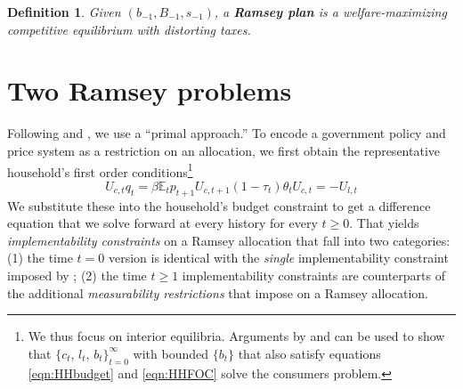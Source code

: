 \documentclass[12pt]{article}
\newcommand{\EE}{\mathbb E}
\newtheorem{definition}[theorem]{Definition}
\begin{document}
\begin{definition}
Given $\left( b_{-1},B_{-1},s_{-1}\right) $, a \textbf{Ramsey plan} is a welfare-maximizing competitive
equilibrium with distorting taxes.
\end{definition}


\section{Two Ramsey problems}

Following \citet{LucasJr.1983}
and
\citet{Aiyagari2002}, we use a
``primal approach.''   To encode a  government policy and price system as a restriction on an allocation,
we  first obtain   the representative household's first order conditions\footnote{We thus focus on interior equilibria. Arguments by \cite{Magill1994} and \cite{Constantinides1996} can be used to show that  $\{c_t$, $l_t$, $b_t\}_{t=0}^\infty $ with bounded $\{b_t\}$ that also satisfy equations \eqref{eqn:HHbudget} and \eqref{eqn:HHFOC} solve the consumers problem.}
\begin{subequations}\label{eqn:HHFOC}
	\begin{equation}
	\label{eqn:Euler}
		U_{c,t} q_t = \beta \EE_t p_{t+1}U_{c,t+1}
	\end{equation}
	\begin{equation}\label{eqn:lcFOC}
		(1-\tau_t)\theta_tU_{c,t} = - U_{l,t}
	\end{equation}


\end{subequations}
We substitute these into the household's budget constraint to get a difference equation that we  solve forward   at every history for every $t \geq 0$.
That yields \textit{implementability constraints} on a Ramsey allocation that fall into two categories: (1) the time $t=0$ version is identical
with the {\em single} implementability constraint imposed by \citet{LucasJr.1983}; (2) the time $t \geq 1$ implementability constraints
are counterparts  of the additional
 \emph{measurability restrictions} that \citet{Aiyagari2002} impose on  a Ramsey allocation.
%
\end{document}
